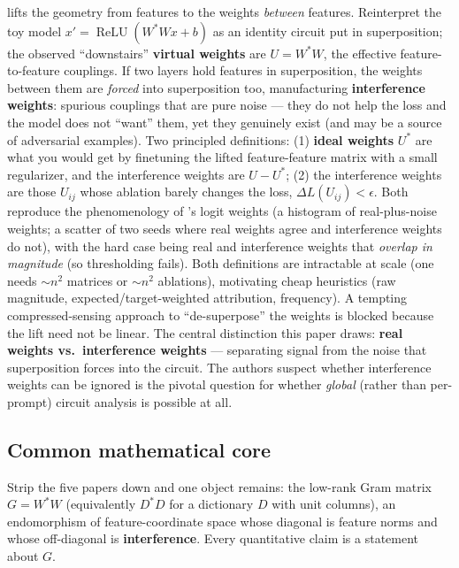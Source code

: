 \textcite{toy-model-of-interference-weights} lifts the geometry from features to the weights \emph{between} features. Reinterpret the toy model $x' = \operatorname{ReLU}(W^{*}Wx+b)$ as an identity circuit put in superposition; the observed ``downstairs'' \textbf{virtual weights} are $U = W^{*}W$, the effective feature-to-feature couplings. If two layers hold features in superposition, the weights between them are \emph{forced} into superposition too, manufacturing \textbf{interference weights}: spurious couplings that are pure noise --- they do not help the loss and the model does not ``want'' them, yet they genuinely exist (and may be a source of adversarial examples). Two principled definitions: (1) \textbf{ideal weights} $U^{*}$ are what you would get by finetuning the lifted feature-feature matrix with a small regularizer, and the interference weights are $U - U^{*}$; (2) the interference weights are those $U_{ij}$ whose ablation barely changes the loss, $\Delta L(U_{ij}) < \epsilon$. Both reproduce the phenomenology of \textcite{towards-monosemanticity}'s logit weights (a histogram of real-plus-noise weights; a scatter of two seeds where real weights agree and interference weights do not), with the hard case being real and interference weights that \emph{overlap in magnitude} (so thresholding fails). Both definitions are intractable at scale (one needs $\sim n^2$ matrices or $\sim n^2$ ablations), motivating cheap heuristics (raw magnitude, expected/target-weighted attribution, frequency). A tempting compressed-sensing approach to ``de-superpose'' the weights is blocked because the lift need not be linear. The central distinction this paper draws: \textbf{real weights vs.\ interference weights} --- separating signal from the noise that superposition forces into the circuit. The authors suspect whether interference weights can be ignored is the pivotal question for whether \emph{global} (rather than per-prompt) circuit analysis is possible at all.


\subsection*{Common mathematical core}

Strip the five papers down and one object remains: the low-rank Gram matrix $G = W^{*}W$ (equivalently $D^{*}D$ for a dictionary $D$ with unit columns), an endomorphism of feature-coordinate space whose diagonal is feature norms and whose off-diagonal is \textbf{interference}. Every quantitative claim is a statement about $G$.

